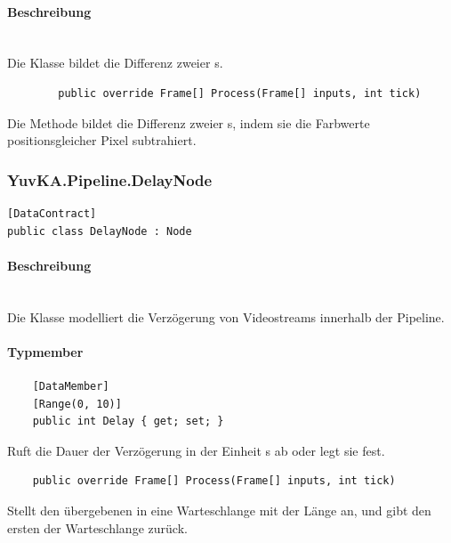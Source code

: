 \paragraph{Beschreibung}~\\
Die Klasse  bildet die Differenz zweier s.

\begin{itemize}
	\begin{verbatim}
		public override Frame[] Process(Frame[] inputs, int tick)
	\end{verbatim}
Die Methode  bildet die Differenz zweier s, indem sie die Farbwerte positionsgleicher Pixel subtrahiert.

\end{itemize}

\subsubsection{YuvKA.Pipeline.DelayNode}

\begin{verbatim}
[DataContract]
public class DelayNode : Node
\end{verbatim}

\paragraph{Beschreibung}~\\
Die Klasse  modelliert die Verzögerung von Videostreams innerhalb der Pipeline.

\paragraph{Typmember}
\begin{itemize}
	
	\begin{verbatim}
	[DataMember]
	[Range(0, 10)]
	public int Delay { get; set; }
	\end{verbatim}
	Ruft die Dauer der Verzögerung in der Einheit s ab oder legt sie fest.

	\begin{verbatim}
	public override Frame[] Process(Frame[] inputs, int tick)
	\end{verbatim}
	Stellt den übergebenen  in eine Warteschlange mit der Länge  an, und gibt den ersten  der Warteschlange zurück.
	
\end{itemize}

